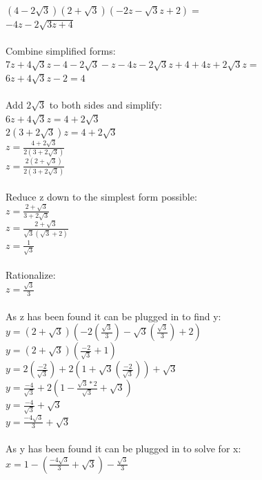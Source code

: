 \documentclass{article}
\begin{document}
\begin{solution}
\\ $(4-2\sqrt{3})(2+\sqrt{3})(-2z-\sqrt{3}z+2) = $
\\ $-4z-2\sqrt{3z+4}$
\\\\ Combine simplified forms:
\\ $7z+4\sqrt{3}z-4-2\sqrt{3}-z-4z-2\sqrt{3}z+4+4z+2\sqrt{3}z = $
\\ $6z+4\sqrt{3}z-2 = 4$
\newline
\\\\ Add $2\sqrt{3}$ to both sides and simplify:
\\ $6z+4\sqrt{3}z = 4 + 2\sqrt{3}$
\\ $2(3+2\sqrt{3})z = 4+2\sqrt{3}$
\\ $z = \frac{4+2\sqrt{3}}{2(3+2\sqrt{3})}$
\\ $z = \frac{2(2+\sqrt{3})}{2(3+2\sqrt{3})}$
\newline
\\\\ Reduce z down to the simplest form possible:
\\ $z = \frac{2+\sqrt{3}}{3+2\sqrt{3}}$
\\ $z = \frac{2+\sqrt{3}}{\sqrt{3}(\sqrt{3}+2)}$
\\ $z = \frac{1}{\sqrt{3}}$
\newline
\\\\ Rationalize:
\\ $z = \frac{\sqrt{3}}{3}$
\newline
\\\\ As z has been found it can be plugged in to find y:
\\ $y = (2+\sqrt{3})(-2(\frac{\sqrt{3}}{3})-\sqrt{3}(\frac{\sqrt{3}}{3})+2)$
\\ $y = (2+\sqrt{3})(\frac{-2}{\sqrt{3}}+1)$
\\ $y = 2(\frac{-2}{\sqrt{3}}) + 2(1+\sqrt{3}(\frac{-2}{\sqrt{3}}))+\sqrt{3}$
\\ $y = \frac{-4}{\sqrt{3}}+2(1-\frac{\sqrt{3}*2}{\sqrt{3}}+\sqrt{3})$
\\ $y = \frac{-4}{\sqrt{3}}+\sqrt{3}$
\\ $y = \frac{-4\sqrt{3}}{3}+\sqrt{3}$
\newline
\\\\ As y has been found it can be plugged in to solve for x:
\\ $x = 1 - (\frac{-4\sqrt{3}}{3}+\sqrt{3})-\frac{\sqrt{3}}{3}$

\end{solution}
\end{document}
